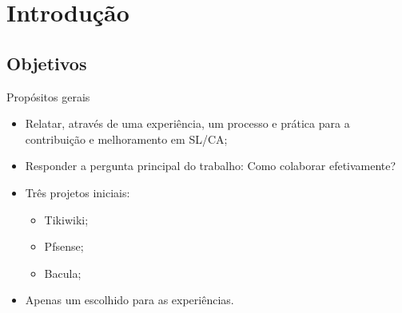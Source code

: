 \date[Encontro UFLA 2008] %
{Encontro Técnico UFLA, 2008}


\AtBeginSubsection[]
{
}



\begin{frame}
  \titlepage
\end{frame}





\section{Introdução}

\subsection{Objetivos}

\begin{frame}{Propósitos gerais}
 \begin{itemize}
  \item <1-> Relatar, através de uma experiência, um processo e prática para a contribuição e melhoramento em SL/CA;
  \item <2- | alert@2> Responder a pergunta principal do trabalho: Como colaborar efetivamente?
  \item <3-> Três projetos iniciais: 
     \begin{itemize}
       \item <4- > Tikiwiki;
       \item <5-> Pfsense;
       \item <6-> Bacula;
     \end{itemize}  
   \item <7-> Apenas um escolhido para as experiências.
 \end{itemize}
\end{frame}

